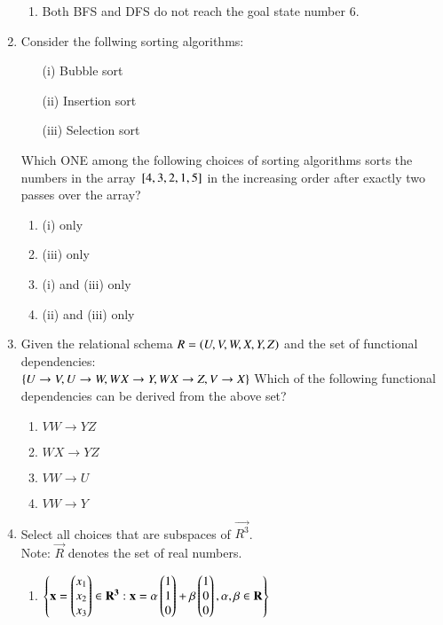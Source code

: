 \documentclass[journal,12pt,onecolumn]{IEEEtran}
\theoremstyle{remark}
\begin{document}
\begin{enumerate}
\begin{enumerate}
      \item Both BFS and DFS  do not reach the goal state number $6$.
  \end{enumerate}
  \item Consider the follwing sorting algorithms:\\
  \begin{enumerate}
      \item[(i)] Bubble sort
      \item[(ii)] Insertion sort
      \item[(iii)] Selection sort\\
  \end{enumerate}
  Which ONE among the following choices of sorting algorithms sorts the numbers in the array ${}\left[4,3,2,1,5\right]$ in the increasing order after exactly two passes over the array?
  \begin{enumerate}
      \item (i) only
      \item (iii) only
      \item (i) and (iii) only
      \item (ii) and (iii) only
  \end{enumerate}
  \item Given the relational schema $R=\left(U,V,W,X,Y,Z\right)$ and the set of functional dependencies:\\
  $\left\{U\to V,U \to W, WX \to Y,WX \to Z,V \to X\right\}$
  Which of the following functional dependencies can be derived from the above set?
  \begin{enumerate}
      \item $VW \to YZ$
      \item $WX \to YZ$
      \item $VW \to U$
      \item $VW \to Y$
  \end{enumerate}
  \item Select all choices that are subspaces of $\Vec{R^3}$.\\
  Note: $\vec{R}$ denotes the set of real numbers.
  \begin{enumerate}
      \item $\left\{\mathbf{x}=\begin{pmatrix}x_1\\x_2\\x_3\end{pmatrix} \in \mathbf{R^3}:\mathbf{x}=\alpha \begin{pmatrix}1\\1\\0\end{pmatrix}+\beta \begin{pmatrix}1\\0\\0\end{pmatrix},\alpha,\beta \in \mathbf{R}\right\}$

\end{enumerate}
\end{enumerate}
\end{document}
